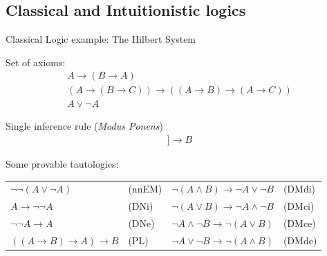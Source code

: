 \documentclass[aspectratio=169, fleqn]{beamer}
\begin{document}
\subsection{Classical and Intuitionistic logics}

\begin{frame}{Classical Logic}
{example: The Hilbert System}

\textcolor{dkblue}{Set of axioms:}
\begin{gather}
A \rightarrow (B \rightarrow A)
\tag{A1} \\
(A \rightarrow (B \rightarrow C)) \rightarrow ((A \rightarrow B) \rightarrow (A \rightarrow C))
\tag{A2} \\
A \lor \neg A
\tag{EM} 
\end{gather}

\textcolor{dkblue}{Single inference rule (\textit{Modus Ponens})}
\begin{gather} 
[\![ A, A \rightarrow B ]\!] \longrightarrow B
\tag{MP}
\end{gather}

\textcolor{dkblue}{Some provable tautologies:}
\begin{tabular}{p{.32\linewidth}p{.2\linewidth} p{.3\linewidth}p{.25\linewidth}}
$\neg \neg (A \lor \neg A)$ & (nnEM) & $\neg (A \land B) \rightarrow \neg A \lor \neg B $ & (DMdi) \\
$A \rightarrow \neg \neg A$ & (DNi)  & $\neg (A \lor B) \rightarrow \neg A \land \neg B $ & (DMci) \\
$\neg \neg A \rightarrow A$ & (DNe)  & $\neg A \land \neg B \rightarrow  \neg (A \lor B) $ & (DMce) \\
$((A \rightarrow B) \rightarrow A) \rightarrow B$ & (PL) & $\neg A \lor \neg B \rightarrow  \neg (A \land B) $ & (DMde)
\end{tabular}

\end{frame}
\end{document}
